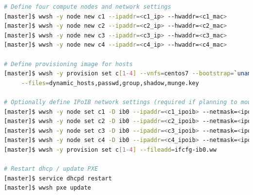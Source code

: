 \documentclass[letterpaper]{article}
\begin{document}

\begin{lstlisting}[language=bash,keywords={},upquote=true,basicstyle=\footnotesize\ttfamily]
# Define four compute nodes and network settings 
[master]$ wwsh -y node new c1 --ipaddr=<c1_ip> --hwaddr=<c1_mac> 
[master]$ wwsh -y node new c2 --ipaddr=<c2_ip> --hwaddr=<c2_mac> 
[master]$ wwsh -y node new c3 --ipaddr=<c3_ip> --hwaddr=<c3_mac> 
[master]$ wwsh -y node new c4 --ipaddr=<c4_ip> --hwaddr=<c4_mac> 

# Define provisioning image for hosts
[master]$ wwsh -y provision set c[1-4] --vnfs=centos7 --bootstrap=`uname -r` \
     --files=dynamic_hosts,passwd,group,shadow,munge.key 

# Optionally define IPoIB network settings (required if planning to mount Lustre* over IB)
[master]$ wwsh -y node set c1 -D ib0 --ipaddr=<c1_ipoib> --netmask=<ipoib_netmask>
[master]$ wwsh -y node set c2 -D ib0 --ipaddr=<c2_ipoib> --netmask=<ipoib_netmask>
[master]$ wwsh -y node set c3 -D ib0 --ipaddr=<c3_ipoib> --netmask=<ipoib_netmask>
[master]$ wwsh -y node set c4 -D ib0 --ipaddr=<c4_ipoib> --netmask=<ipoib_netmask>
[master]$ wwsh -y provision set c[1-4] --fileadd=ifcfg-ib0.ww

# Restart dhcp / update PXE
[master]$ service dhcpd restart
[master]$ wwsh pxe update
\end{lstlisting}

\end{document}
